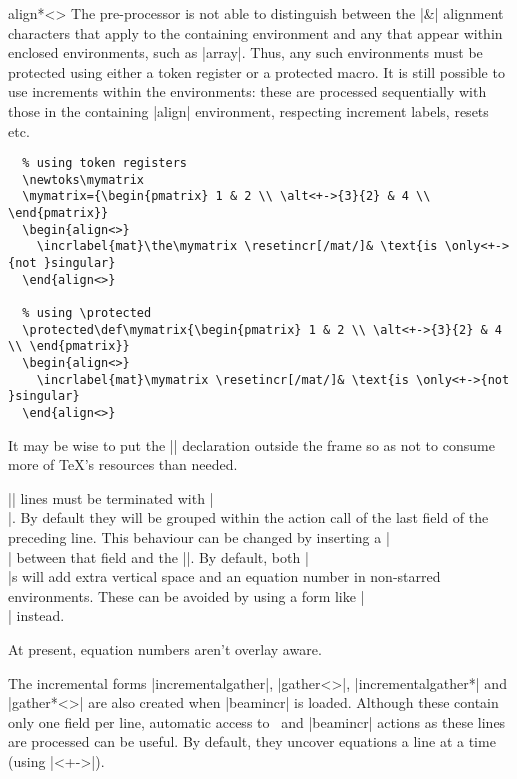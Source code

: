 \documentclass[a4paper]{ltxdoc}
\begin{document}
\begin{environment}{{align*<>}}
    The pre-processor is not able to distinguish between the |&| alignment
    characters that apply to the containing environment and any that appear
    within enclosed environments, such as |array|.  Thus, any such environments
    must be protected using either a token register or a protected macro.  It is
    still possible to use increments within the environments: these are
    processed sequentially with those in the containing |align| environment,
    respecting increment labels, resets etc.

    \example
\begin{verbatim}
  % using token registers
  \newtoks\mymatrix
  \mymatrix={\begin{pmatrix} 1 & 2 \\ \alt<+->{3}{2} & 4 \\ \end{pmatrix}}
  \begin{align<>}
    \incrlabel{mat}\the\mymatrix \resetincr[/mat/]& \text{is \only<+->{not }singular}
  \end{align<>}

  % using \protected
  \protected\def\mymatrix{\begin{pmatrix} 1 & 2 \\ \alt<+->{3}{2} & 4 \\ \end{pmatrix}}
  \begin{align<>}
    \incrlabel{mat}\mymatrix \resetincr[/mat/]& \text{is \only<+->{not }singular}
  \end{align<>}

\end{verbatim}
    It may be wise to put the |\newtoks| declaration outside the frame so as not
    to consume more of \TeX's resources than needed.  

    |\intertext| lines must be terminated with |\\|.  By default they will be
    grouped within the action call of the last field of the preceding line.
    This behaviour can be changed by inserting a |\\| between that field and the
    |\intertext|.  By default, both |\\|s will add extra vertical space and an
    equation number in non-starred environments.  These can be avoided by using
    a form like |\nonumber\\[-3ex]| instead.

    At present, equation numbers aren't overlay aware.
\end{environment}
%
The incremental forms |incrementalgather|, |gather<>|, |incrementalgather*| and
|gather*<>| are also created when |beamincr| is loaded.  Although these contain
only one field per line, automatic access to \beamer\ and |beamincr| actions as
these lines are processed can be useful.  By default, they uncover equations a
line at a time (using |<+->|).
\end{document}
